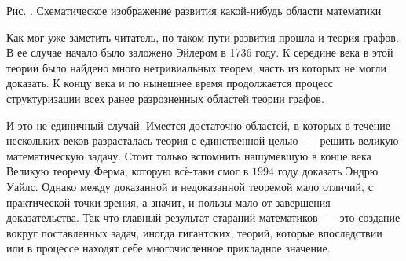 \begin{center}

	\small Рис. \images. Схематическое изображение развития какой-нибудь области математики
\end{center}

	Как мог уже заметить читатель, по таком пути развития прошла и теория графов. В ее случае начало было заложено Эйлером в 1736 году. К середине  века в этой теории было найдено много нетривиальных теорем, часть из которых не могли доказать. К концу  века и по нынешнее время продолжается процесс структуризации всех ранее разрозненных областей теории графов.

	И это не единичный случай. Имеется достаточно областей, в которых в течение нескольких веков разрасталась теория с единственной целью~---~решить великую математическую задачу. Стоит только вспомнить нашумевшую в конце  века Великую теорему Ферма, которую всё-таки смог в $1994$ году доказать Эндрю Уайлс. Однако между доказанной и недоказанной теоремой мало отличий, с практической точки зрения, а значит, и пользы мало от завершения доказательства. Так что главный результат стараний математиков~---~это создание вокруг поставленных задач, иногда гигантских, теорий, которые впоследствии или в процессе находят себе многочисленное прикладное значение.
	
